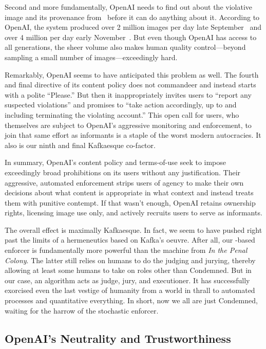 Second and more fundamentally, OpenAI needs to find out about the violative
image and its provenance from \DALLE\ before it can do anything about it.
According to OpenAI, the system produced over 2 million images per day late
September~\cite{OpenAI2022a} and over 4 million per day early
November~\cite{OpenAI2022h}. But even though OpenAI has access to all
generations, the sheer volume also makes human quality control---beyond sampling
a small number of images---exceedingly hard.

Remarkably, OpenAI seems to have anticipated this problem as well. The fourth
and final directive of its content policy does not commandeer and instead starts
with a polite “Please.” But then it inappropriately invites users to “report any
suspected violations” and promises to “take action accordingly, up to and
including terminating the violating account.” This open call for users, who
themselves are subject to OpenAI's aggressive monitoring and enforcement, to
join that same effort as informants is a staple of the worst modern autocracies.
It also is our ninth and final Kafkaesque co-factor.

In summary, OpenAI's content policy and terms-of-use seek to impose exceedingly
broad prohibitions on its users without any justification. Their aggressive,
automated enforcement strips users of agency to make their own decisions about
what content is appropriate in what context and instead treats them with
punitive contempt. If that wasn't enough, OpenAI retains ownership rights,
licensing image use only, and actively recruits users to serve as informants.

The overall effect is maximally Kafkaesque. In fact, we seem to have pushed
right past the limits of a hermeneutics based on Kafka's oeuvre. After all, our
-based enforcer is fundamentally more powerful than the machine from \emph{In
the Penal Colony}. The latter still relies on humans to do the judging and
jurying, thereby allowing at least some humans to take on roles other than
Condemned. But in our case, an algorithm acts as judge, jury, and executioner.
It has successfully exorcised even the last vestige of humanity from a world in
thrall to automated processes and quantitative everything. In short, now we all
are just Condemned, waiting for the harrow of the stochastic enforcer.


\subsection{OpenAI's Neutrality and Trustworthiness}

